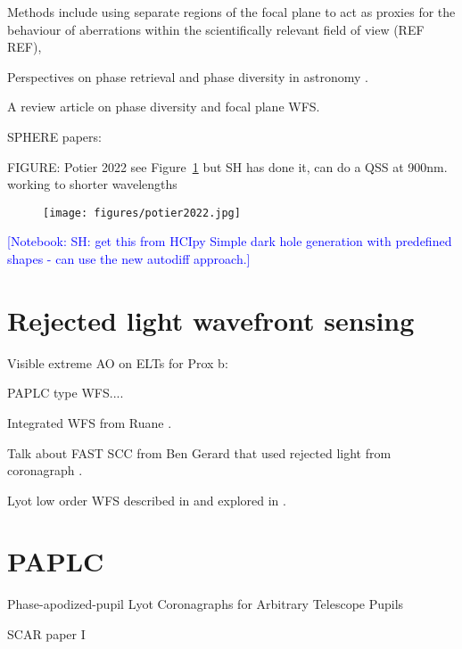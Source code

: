 \documentclass[letterpaper]{ar-1col}
\newcommand{\notebooksuggestion}[1]{\textcolor{blue}{[Notebook: #1]}}
\begin{document}
Methods include using separate regions of the focal plane to act as proxies for the behaviour of aberrations within the scientifically relevant field of view (REF REF), 

Perspectives on phase retrieval and phase diversity in astronomy \citet{Gonsalves14}.

A review article on phase diversity and focal plane WFS. \citep{Fienup13}


SPHERE papers:

FIGURE: Potier 2022 see Figure~\ref{fig:fpwfsclean} but SH has done it, can do a QSS at 900nm. working to shorter wavelengths

\begin{figure}[ht]
  \centering
  \texttt{[image: figures/potier2022.jpg]}
  \caption{}
  \label{fig:fpwfsclean}
\end{figure}

\notebooksuggestion{SH: get this from HCIpy Simple dark hole generation with predefined shapes - can use the new autodiff approach.}

\lipsum[2-4]

\section{Rejected light wavefront sensing} 

Visible extreme AO on ELTs for Prox b: \citep{Fowler23}

PAPLC type WFS....

Integrated WFS from Ruane \citep{Ruane20}.

Talk about FAST SCC from Ben Gerard that used rejected light from coronagraph \citep{Gerard18}.


Lyot low order WFS described in \citet{Guyon09} and explored in \citet{Singh14,Singh15}.


\lipsum[2-4]

\section{PAPLC}
Phase-apodized-pupil Lyot Coronagraphs for Arbitrary Telescope Pupils \citep{Por20}

SCAR paper I \citep{Por20a}
\end{document}
